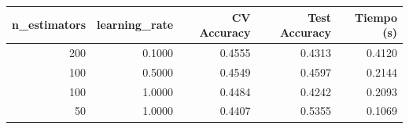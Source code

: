 \begin{tabular}{rrrrr}
\toprule
n\_estimators & learning\_rate & CV Accuracy & Test Accuracy & Tiempo (s) \\
\midrule
200 & 0.1000 & 0.4555 & 0.4313 & 0.4120 \\
100 & 0.5000 & 0.4549 & 0.4597 & 0.2144 \\
100 & 1.0000 & 0.4484 & 0.4242 & 0.2093 \\
50 & 1.0000 & 0.4407 & 0.5355 & 0.1069 \\
\bottomrule
\end{tabular}

